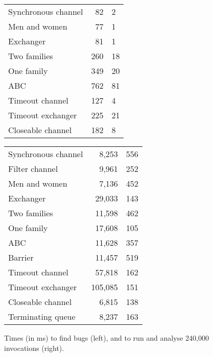 \begin{figure}
\begin{minipage}{0.48\textwidth}%
\begin{tabular}{@{}lr@{$\null\pm\null$}l} %
Synchronous channel    & 82 & 2 \\
Men and women         & 77 &  1 \\
Exchanger            &  81 & 1 \\
Two families          & 260 & 18\\
One family            & 349 & 20\\
ABC      	       & 762 & 81\\
Timeout channel  	& 127	 & 4 \\
Timeout exchanger  	& 225	 & 21 \\
Closeable channel     & 182 & 8\\
\end{tabular}
\end{minipage}
\begin{minipage}{0.51\textwidth}
\begin{tabular}{lr@{$\null\pm\null$}l@{}} %
Synchronous channel  	& 8,253	 & 556 \\
Filter channel & 9,961 &  252 \\
Men and women  	& 7,136	 & 452 \\
Exchanger & 29,033 & 143 \\
Two families  &	11,598	 & 462 \\
One family  	& 17,608	 & 105 \\
ABC  	& 11,628	 & 357 \\
Barrier  	& 11,457	 & 519 \\
Timeout channel  	& 57,818	 & 162 \\
Timeout exchanger  	& 105,085	 & 151 \\
Closeable channel  	& 6,815	 & 138  \\
Terminating queue  	& 8,237	 & 163 \\
\end{tabular}
\end{minipage}
\caption{Times (in ms) to find bugs (left), and to run and analyse 240,000
  invocations (right). \label{fig:bug-times}\label{fig:throughput}}
\end{figure}


